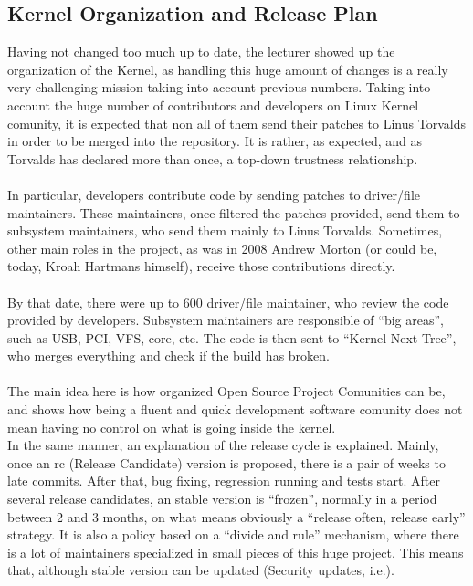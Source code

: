 \documentclass[11pt]{article}
\begin{document}
\subsection{Kernel Organization and Release Plan}
Having not changed too much up to date, the lecturer showed up the organization of the Kernel, as handling this huge amount of changes is a really very challenging mission taking into account previous numbers. Taking into account the huge number of contributors and developers on Linux Kernel comunity, it is expected that non all of them send their patches to Linus Torvalds in order to be merged into the repository. It is rather, as expected, and as Torvalds has declared more than once, a top-down trustness relationship.\\
\\
In particular, developers contribute code by sending patches to driver/file maintainers. These maintainers, once filtered the patches provided, send them to subsystem maintainers, who send them mainly to Linus Torvalds. Sometimes, other main roles in the project, as was in 2008 Andrew Morton (or could be, today, Kroah Hartmans himself), receive those contributions directly.\\
\\
By that date, there were up to 600 driver/file maintainer, who review the code provided by developers. Subsystem maintainers are responsible of ``big areas'', such as USB, PCI, VFS, core, etc. The code is then sent to ``Kernel Next Tree'', who merges everything and check if the build has broken.\\
\\
The main idea here is how organized Open Source Project Comunities can be, and shows how being a fluent and quick development software comunity does not mean having no control on what is going inside the kernel.\\
In the same manner, an explanation of the release cycle is explained. Mainly, once an rc (Release Candidate) version is proposed, there is a pair of weeks to late commits. After that, bug fixing, regression running and tests start. After several release candidates, an stable version is ``frozen'', normally in a period between 2 and 3 months, on what means obviously a ``release often, release early'' strategy. It is also a policy based on a ``divide and rule'' mechanism, where there is a lot of maintainers specialized in small pieces of this huge project. This means that, although stable version can be updated (Security updates, i.e.).\\
\end{document}
